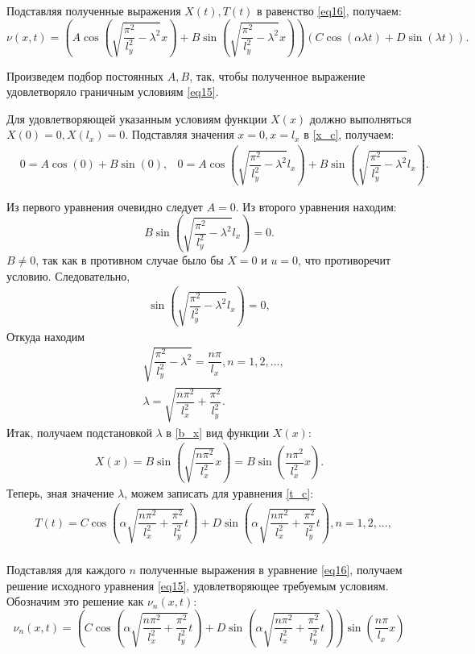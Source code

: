 {Подставляя полученные выражения $X(t), T(t)$ в равенство \eqref{eq16}, получаем:
\begin{equation}
	\nu(x,t) = (A\cos(\sqrt{\dfrac{\pi^2}{l_y^2}-\lambda^2}x) + B\sin(\sqrt{\dfrac{\pi^2}{l_y^2}-\lambda^2}x))(C\cos(\alpha\lambda t) + D\sin(\lambda t)).
\end{equation}

Произведем подбор постоянных $A, B$, так, чтобы полученное выражение удовлетворяло граничным условиям \eqref{eq15}. 

Для удовлетворяющей указанным условиям функции $X(x)$ должно выполняться $X(0)=0, X(l_x)=0$. Подставляя значения $x=0, x=l_x$ в \eqref{x_c}, получаем:
\begin{align*}
	& 0 = A\cos(0)+B\sin(0), &0 = A\cos(\sqrt{\dfrac{\pi^2}{l_y^2}-\lambda^2}l_x) + B\sin(\sqrt{\dfrac{\pi^2}{l_y^2}-\lambda^2}l_x).
\end{align*}

Из первого уравнения очевидно следует $A=0$. Из второго уравнения находим:
\begin{equation}\label{b_x}
	B\sin(\sqrt{\dfrac{\pi^2}{l_y^2}-\lambda^2}l_x) = 0.
\end{equation}
	$B\neq0$, так как в противном случае было бы $X=0$ и $u=0$, что противоречит условию. Следовательно, 
	\begin{align*}
	\sin(\sqrt{\dfrac{\pi^2}{l_y^2}-\lambda^2}l_x) = 0,
	\end{align*}
Откуда находим
	\begin{align*}
	&\sqrt{\dfrac{\pi^2}{l_y^2}-\lambda^2} = \dfrac{n\pi}{l_x}, n=1,2,..., \\
	&\lambda = \sqrt{\dfrac{n\pi^2}{l_x^2} + \dfrac{\pi^2}{l_y^2}}.
	\end{align*}
Итак, получаем подстановкой $\lambda$ в \eqref{b_x} вид функции $X(x)$:
	\begin{align*}
	X(x) = B\sin(\sqrt{\dfrac{n\pi^2}{l_x^2}}x) = B\sin(\dfrac{n\pi^2}{l_x^2}x).
	\end{align*}
Теперь, зная значение $\lambda$, можем записать для уравнения \eqref{t_c}:
	\begin{align*}
	&T(t) = C\cos(\alpha\sqrt{\dfrac{n\pi^2}{l_x^2} + \dfrac{\pi^2}{l_y^2}}t) + 
	D\sin(\alpha\sqrt{\dfrac{n\pi^2}{l_x^2} + \dfrac{\pi^2}{l_y^2}}t), n=1,2,..., \\
	\end{align*}
	
Подставляя для каждого $n$ полученные выражения в уравнение \eqref{eq16}, получаем решение исходного уравнения \eqref{eq15}, удовлетворяющее требуемым условиям. Обозначим это решение как $\nu_n(x,t)$:
	\begin{equation}
	\nu_n(x,t) = (C\cos(\alpha\sqrt{\dfrac{n\pi^2}{l_x^2} + \dfrac{\pi^2}{l_y^2}}t) + 
	D\sin(\alpha\sqrt{\dfrac{n\pi^2}{l_x^2} + \dfrac{\pi^2}{l_y^2}}t)) \sin(\dfrac{n\pi}{l_x}x)
	\end{equation}	 
	
}
